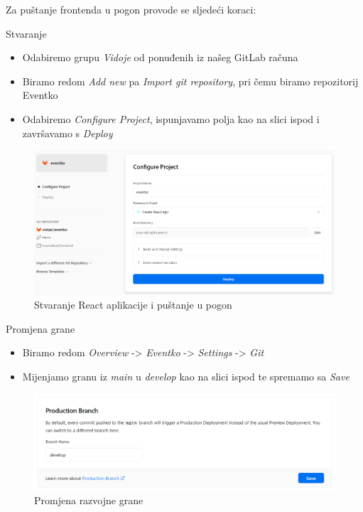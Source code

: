 			\indent Za puštanje frontenda u pogon provode se sljedeći koraci:
			\begin{packed_enum}
				\item Stvaranje
				\begin{itemize}
					\item Odabiremo grupu \textit{Vidoje} od ponuđenih iz našeg GitLab računa
					\item Biramo redom \textit{Add new} pa \textit{Import git repository}, pri čemu biramo repozitorij Eventko
					\item Odabiremo \textit{Configure Project}, ispunjavamo polja kao na slici ispod i završavamo s \textit{Deploy}
				\end{itemize}
				\begin{figure}[H]
					\includegraphics[width=\textwidth]{Opis deploymenta/Slika8.png}
					\caption{Stvaranje React aplikacije i puštanje u pogon}
				\end{figure}
				
				\item Promjena grane
				\begin{itemize}
					\item Biramo redom \textit{Overview} -> \textit{Eventko} -> \textit{Settings} -> \textit{Git}
					\item Mijenjamo granu iz \textit{main} u \textit{develop} kao na slici ispod te spremamo sa \textit{Save}
				\end{itemize}
				\begin{figure}[H]
					\includegraphics[width=\textwidth]{Opis deploymenta/Slika9.png}
					\caption{Promjena razvojne grane}
				\end{figure}
				\eject
				

\end{packed_enum}
